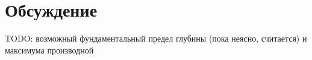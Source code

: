 \section{Обсуждение}

TODO: возможный фундаментальный предел глубины (пока неясно, считается) и максимума производной